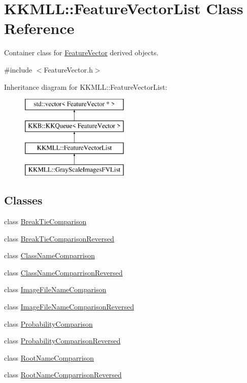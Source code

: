 \hypertarget{class_k_k_m_l_l_1_1_feature_vector_list}{}\section{K\+K\+M\+LL\+:\+:Feature\+Vector\+List Class Reference}
\label{class_k_k_m_l_l_1_1_feature_vector_list}


Container class for \hyperlink{class_k_k_m_l_l_1_1_feature_vector}{Feature\+Vector} derived objects.  




{\ttfamily \#include $<$Feature\+Vector.\+h$>$}

Inheritance diagram for K\+K\+M\+LL\+:\+:Feature\+Vector\+List\+:\begin{figure}[H]
\begin{center}
\leavevmode
\includegraphics[height=4.000000cm]{class_k_k_m_l_l_1_1_feature_vector_list}
\end{center}
\end{figure}
\subsection*{Classes}
\begin{DoxyCompactItemize}
\item 
class \hyperlink{class_feature_vector_list_1_1_break_tie_comparison}{Break\+Tie\+Comparison}
\item 
class \hyperlink{class_feature_vector_list_1_1_break_tie_comparison_reversed}{Break\+Tie\+Comparison\+Reversed}
\item 
class \hyperlink{class_feature_vector_list_1_1_class_name_comparrison}{Class\+Name\+Comparrison}
\item 
class \hyperlink{class_feature_vector_list_1_1_class_name_comparrison_reversed}{Class\+Name\+Comparrison\+Reversed}
\item 
class \hyperlink{class_feature_vector_list_1_1_image_file_name_comparison}{Image\+File\+Name\+Comparison}
\item 
class \hyperlink{class_feature_vector_list_1_1_image_file_name_comparison_reversed}{Image\+File\+Name\+Comparison\+Reversed}
\item 
class \hyperlink{class_feature_vector_list_1_1_probability_comparison}{Probability\+Comparison}
\item 
class \hyperlink{class_feature_vector_list_1_1_probability_comparison_reversed}{Probability\+Comparison\+Reversed}
\item 
class \hyperlink{class_feature_vector_list_1_1_root_name_comparrison}{Root\+Name\+Comparrison}
\item 
class \hyperlink{class_feature_vector_list_1_1_root_name_comparrison_reversed}{Root\+Name\+Comparrison\+Reversed}
\end{DoxyCompactItemize}

